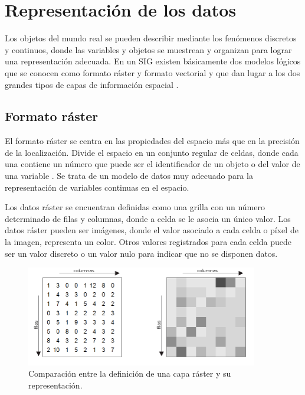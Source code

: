 \section{Representación de los datos }
\label{sec:cap2-tecnicas-graficas-representacion}
Los objetos del mundo real se pueden describir mediante los fenómenos discretos y continuos, donde las variables y objetos se muestrean y organizan para lograr una representación adecuada. En un
SIG existen básicamente dos modelos lógicos que se conocen como formato ráster y formato vectorial
y que dan lugar a los dos grandes tipos de capas de información espacial \cite{fAlonsoSig2006}.

\subsection{Formato ráster}
El formato ráster se centra en las propiedades del espacio más que en la precisión de la
localización. Divide el espacio en un conjunto regular de celdas, donde cada una contiene un
número que puede ser el identificador de un objeto o del valor de una variable
\cite{fAlonsoSig2006}. Se trata de un modelo de datos muy adecuado para la representación de
variables continuas en el espacio.

Los datos ráster se encuentran definidas como una grilla con un número determinado de filas y
columnas, donde a celda se le asocia un único valor. Los datos ráster pueden ser imágenes, donde
el valor asociado a cada celda o píxel de la imagen, representa un color. Otros valores
registrados para cada celda puede ser un valor discreto o un valor nulo para indicar que no se
disponen datos.

\begin{figure}
\centering
\includegraphics[width=0.9\textwidth]{capitulo-2/graphics/representacion-raster.png}
\caption{\label{fig:sig-capa-raster} Comparación entre la definición de una capa ráster y su representación. }
\end{figure}

